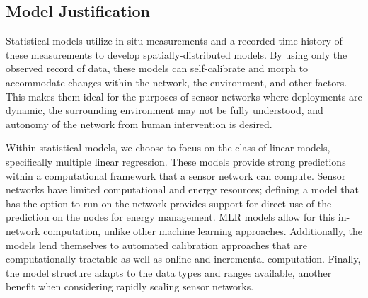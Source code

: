 \documentclass[prodmode,acmtosn]{acmsmall}
\begin{document}
\subsection{Model Justification}
Statistical models utilize in-situ measurements and a recorded time history of these measurements to develop spatially-distributed models.
By using only the observed record of data, these models can self-calibrate and morph to accommodate changes within the network, the environment, and other factors.
This makes them ideal for the purposes of sensor networks where deployments are dynamic, the surrounding environment may not be fully understood, and autonomy of the network from human intervention is desired.

Within statistical models, we choose to focus on the class of linear models, specifically multiple linear regression.
These models provide strong predictions within a computational framework that a sensor network can compute.
Sensor networks have limited computational and energy resources; defining a model that has the option to run on the network provides support for direct use of the prediction on the nodes for energy management.
MLR models allow for this in-network computation, unlike other machine learning approaches.
Additionally, the models lend themselves to automated calibration approaches that are computationally tractable as well as online and incremental computation.
Finally, the model structure adapts to the data types and ranges available, another benefit when considering rapidly scaling sensor networks.
\end{document}
